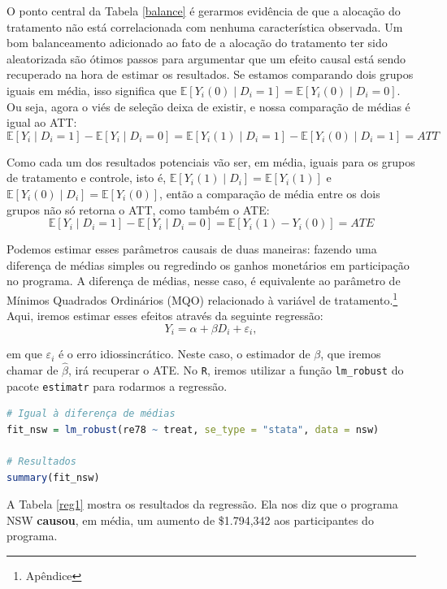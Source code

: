 O ponto central da Tabela \ref{balance} é gerarmos evidência de que a alocação do tratamento não está correlacionada com nenhuma característica observada. Um bom balanceamento adicionado ao fato de a alocação do tratamento ter sido aleatorizada são ótimos passos para argumentar que um efeito causal está sendo recuperado na hora de estimar os resultados. Se estamos comparando dois grupos iguais em média, isso significa que $\mathbb{E}[Y_i(0) \mid D_i = 1] = \mathbb{E}[Y_i(0) \mid D_i = 0]$. Ou seja, agora o viés de seleção deixa de existir, e nossa comparação de médias é igual ao ATT:
$$
\mathbb{E}[Y_i \mid D_i = 1] - \mathbb{E}[Y_i \mid D_i = 0] = \mathbb{E}[Y_i(1) \mid D_i = 1]  -\mathbb{E}[Y_i(0) \mid D_i = 1] = ATT
$$

Como cada um dos resultados potenciais vão ser, em média, iguais para os grupos de tratamento e controle, isto é, $\mathbb{E}[Y_i(1) \mid D_i] = \mathbb{E}[Y_i(1)]$ e $\mathbb{E}[Y_i(0) \mid D_i] = \mathbb{E}[Y_i(0)]$, então a comparação de média entre os dois grupos não só retorna o ATT, como também o ATE:
$$
\mathbb{E}[Y_i \mid D_i = 1] - \mathbb{E}[Y_i \mid D_i = 0] = \mathbb{E}[Y_i(1) - Y_i(0)]  = ATE
$$

Podemos estimar esses parâmetros causais de duas maneiras: fazendo uma diferença de médias simples ou regredindo os ganhos monetários em participação no programa. A diferença de médias, nesse caso, é equivalente ao parâmetro de Mínimos Quadrados Ordinários (MQO) relacionado à variável de tratamento.\footnote{Apêndice} Aqui, iremos estimar esses efeitos através da seguinte regressão:
$$
Y_i = \alpha + \beta D_i + \varepsilon_i,
$$

\noindent em que $\varepsilon_i$ é o erro idiossincrático. Neste caso, o estimador de $\beta$, que iremos chamar de $\hat{\beta}$, irá recuperar o ATE. No \texttt{R}, iremos utilizar a função \texttt{lm\_robust} do pacote \texttt{estimatr} para rodarmos a regressão.

\begin{boxH}
\begin{lstlisting}[language = R]
# Igual à diferença de médias
fit_nsw = lm_robust(re78 ~ treat, se_type = "stata", data = nsw)

# Resultados
summary(fit_nsw)
\end{lstlisting}
\end{boxH}

A Tabela \ref{reg1} mostra os resultados da regressão. Ela nos diz que o programa NSW \textbf{causou}, em média, um aumento de \$1.794,342 aos participantes do programa.

